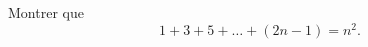 

\begin{exercice}\label{exoSerieUn0016}

	Montrer que 
	\begin{equation}
		1+3+5+\ldots+(2n-1)=n^2.
	\end{equation}

\end{exercice}
